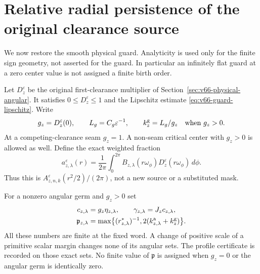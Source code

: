 \section{Relative radial persistence of the original clearance source}
\label{sec:v68-radial-persistence}
We now restore the smooth physical guard. Analyticity is used only for
the finite sign geometry, not asserted for the guard. In particular an
infinitely flat guard at a zero center value is not assigned a finite
birth order.

Let $D_z^\varepsilon$ be the original first-clearance multiplier of
Section~\ref{sec:v66-physical-angular}. It satisfies
$0\le D_z^\varepsilon\le1$ and the Lipschitz estimate
\eqref{eq:v66-guard-lipschitz}. Write
\begin{equation}\label{eq:v68-positive-center-guard}
 g_z=D_z^\varepsilon(0),\qquad
 L_g=C_g\varepsilon^{-1},\qquad
 k_z^{\rm g}=L_g/g_z\quad\hbox{when }g_z>0.
\end{equation}
At a competing-clearance seam $g_z=1$. A non-seam critical center
with $g_z>0$ is allowed as well. Define the exact weighted fraction
\begin{equation}\label{eq:v68-weighted-radial-fraction}
 a_{z,\lambda}^{\varepsilon}(r)=\frac1{2\pi}\int_0^{2\pi}
 B_{z,\lambda}(r\omega_\phi)D_z^\varepsilon(r\omega_\phi)\,d\phi.
\end{equation}
Thus this is $A_{z,n,k}^{\varepsilon}(r^2/2)/(2\pi)$, not a new
source or a substituted mask.

For a nonzero angular germ and $g_z>0$ set
\begin{align}
 c_{z,\lambda}&=g_z\eta_{z,\lambda},\qquad
 \gamma_{z,\lambda}=J_zc_{z,\lambda},\notag\\
 \mathfrak p_{z,\lambda}
    &=\max\bigl\{(r_{z,\lambda}^*)^{-1},
             2(k_{z,\lambda}^{\rm a}+k_z^{\rm g})\bigr\}.
                                                        \label{eq:v68-persistence-number}
\end{align}
All these numbers are finite at the fixed word. A change of positive
scale of a primitive scalar margin changes none of its angular sets.
The profile certificate is recorded on those exact sets. No finite
value of $\mathfrak p$ is assigned when $g_z=0$ or the angular germ
is identically zero.

